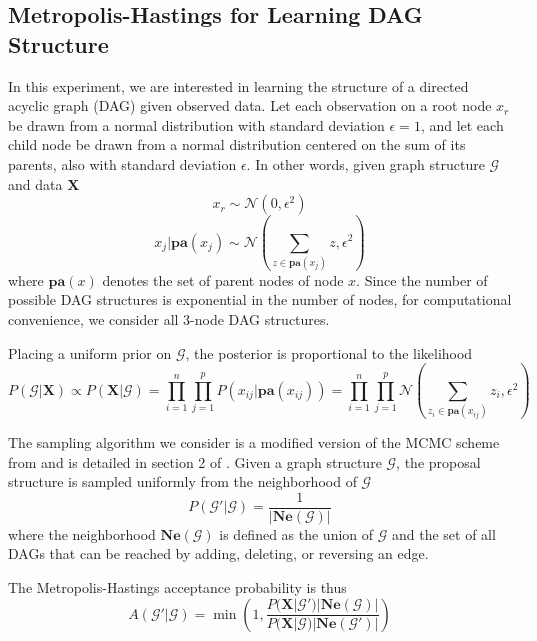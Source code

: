 \documentclass[a4paper,12pt]{article}
\begin{document}
\subsection{Metropolis-Hastings for Learning DAG Structure}
In this experiment, we are interested in learning the structure of a directed acyclic graph (DAG) given observed data. Let each observation on a root node $x_{r}$ be drawn from a normal distribution with standard deviation $\epsilon=1$, and let each child node be drawn from a normal distribution centered on the sum of its parents, also with standard deviation $\epsilon$. In other words, given graph structure $\mathcal{G}$ and data $\mathbf{X}$
\begin{equation}
    x_{r} \sim \mathcal{N}(0, \epsilon^2)
\end{equation}
\begin{equation}
    x_{j}|\mathbf{pa}(x_{j}) \sim \mathcal{N}(\sum_{z \in \mathbf{pa}(x_{j})} z, \epsilon^2)
\end{equation}
where $\mathbf{pa}(x)$ denotes the set of parent nodes of node $x$. Since the number of possible DAG structures is exponential in the number of nodes, for computational convenience, we consider all 3-node DAG structures.

Placing a uniform prior on $\mathcal{G}$, the posterior is proportional to the likelihood
\begin{equation}
    P(\mathcal{G}|\mathbf{X}) \propto P(\mathbf{X}|\mathcal{G}) = \prod_{i=1}^{n} \prod_{j=1}^{p} P(x_{ij}|\mathbf{pa}(x_{ij})) = \prod_{i=1}^{n} \prod_{j=1}^{p}
    \mathcal{N}(\sum_{z_{i} \in \mathbf{pa}(x_{ij})} z_{i}, \epsilon^2)
\end{equation}

The sampling algorithm we consider is a modified version of the MCMC scheme from \cite{madigan_bayesian_1995} and is detailed in section 2 of \cite{grzegorczyk_improving_2008}. Given a graph structure $\mathcal{G}$, the proposal structure is sampled uniformly from the neighborhood of $\mathcal{G}$
\begin{equation}
P(\mathcal{G}' | \mathcal{G}) = \frac{1}{|\mathbf{Ne}(\mathcal{G})|}
\end{equation}
where the neighborhood $\mathbf{Ne}(\mathcal{G})$ is defined as the union of $\mathcal{G}$ and the set of all DAGs that can be reached by adding, deleting, or reversing an edge.

The Metropolis-Hastings acceptance probability is thus
\begin{equation}
A(\mathcal{G}'|\mathcal{G}) = \min{\left(1,\frac{P(\mathbf{X}|\mathcal{G}')|\mathbf{Ne}(\mathcal{G})|}{P(\mathbf{X}|\mathcal{G})|\mathbf{Ne}(\mathcal{G}')|}\right)}
\end{equation}
\end{document}
